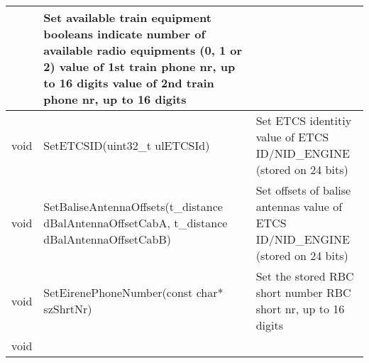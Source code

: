 \documentclass{template/openetcs_article}
\begin{document}
\begin{longtable}{|l|l|l|}
	&	\begin{minipage}[t]{0.45\linewidth} Set available train equipment
	\newline [in] booleans
	\newline [in] indicate number of available radio equipments (0, 1 or 2)
	\newline [in] value of 1st train phone nr, up to 16 digits
	\newline [in] value of 2nd train phone nr, up to 16 digits \end{minipage} \\
	\hline
		\begin{minipage}[t]{0.10\linewidth} void \end{minipage} 
	&	\begin{minipage}[t]{0.50\linewidth} SetETCSID(uint32\_t ulETCSId) \end{minipage} 
	&	\begin{minipage}[t]{0.45\linewidth} Set ETCS identitiy
	\newline [in] value of ETCS ID/NID\_ENGINE (stored on 24 bits) \end{minipage} \\
	\hline
		\begin{minipage}[t]{0.10\linewidth} void \end{minipage} 
	&	\begin{minipage}[t]{0.50\linewidth} SetBaliseAntennaOffsets(t\_distance dBalAntennaOffsetCabA, t\_distance dBalAntennaOffsetCabB) \end{minipage} 
	&	\begin{minipage}[t]{0.45\linewidth} Set offsets of balise antennas
	\newline [in] value of ETCS ID/NID\_ENGINE (stored on 24 bits) \end{minipage} \\
	\hline
		\begin{minipage}[t]{0.10\linewidth} void \end{minipage} 
	&	\begin{minipage}[t]{0.50\linewidth} SetEirenePhoneNumber(const char* szShrtNr) \end{minipage} 
	&	\begin{minipage}[t]{0.45\linewidth} Set the stored RBC short number
	\newline [in] RBC short nr, up to 16 digits \end{minipage} \\
	\hline
		\begin{minipage}[t]{0.10\linewidth} void \end{minipage} 

\end{longtable}
\end{document}
